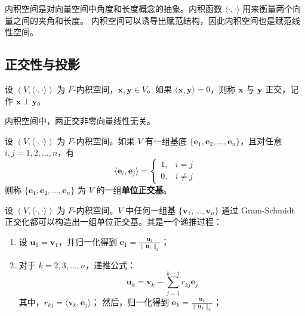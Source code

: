 \begin{note}
    内积空间是对向量空间中角度和长度概念的抽象。内积函数 $ \langle\cdot,\cdot\rangle $ 用来衡量两个向量之间的夹角和长度。
    内积空间可以诱导出赋范结构，因此内积空间也是赋范线性空间。
\end{note}

\subsection{正交性与投影}
\begin{definition}[正交 Orthogonality]
    设 $ (V,\langle\cdot,\cdot\rangle) $ 为 $F$-内积空间，$ \mathbf{x},\mathbf{y}\in V $。如果 $ \langle \mathbf{x},\mathbf{y}\rangle=0 $，则称 $ \mathbf{x} $ 与 $ \mathbf{y} $ 正交，记作 $ \mathbf{x}\perp \mathbf{y} $。
    \label{def:orthogonality}
\end{definition}

\begin{proposition}
    内积空间中，两正交非零向量线性无关。
\end{proposition}

\begin{definition}
    设 $ (V,\langle\cdot,\cdot\rangle) $ 为 $F$-内积空间。如果 $ V $ 有一组基底 $ \{\mathbf{e}_1,\mathbf{e}_2,\ldots,\mathbf{e}_n\} $，且对任意 $ i,j=1,2,\ldots,n $，有
    \[
        \langle \mathbf{e}_i,\mathbf{e}_j\rangle = \begin{cases}
            1, & i=j \\
            0, & i\neq j
        \end{cases}
    \]
    则称 $ \{\mathbf{e}_1,\mathbf{e}_2,\ldots,\mathbf{e}_n\} $ 为 $ V $ 的一组\textbf{单位正交基}。
    \label{def:orthonormal_basis}
\end{definition}

\begin{proposition}
    设 $ (V,\langle\cdot,\cdot\rangle) $ 为 $F$-内积空间。$V$ 中任何一组基 $ \{\mathbf{v}_1,\ldots,\mathbf{v}_n\} $ 
    通过 Gram-Schmidt 正交化都可以构造出一组单位正交基。其是一个递推过程：
    \begin{enumerate}
        \item 设 $ \mathbf{u}_1 = \mathbf{v}_1 $，并归一化得到 $ \mathbf{e}_1 = \frac{\mathbf{u}_1}{\|\mathbf{u}_1\|_2} $；
        \item 对于 $ k=2,3,\ldots,n $，递推公式：
        \[
            \mathbf{u}_k = \mathbf{v}_k - \sum_{j=1}^{k-1} r_{kj} \mathbf{e}_j
        \]
        其中，$ r_{kj} = \langle \mathbf{v}_k,\mathbf{e}_j\rangle $；
        然后，归一化得到 $ \mathbf{e}_k = \frac{\mathbf{u}_k}{\|\mathbf{u}_k\|_2} $；
    \end{enumerate}
    \label{prop:gram_schmidt}
\end{proposition}

